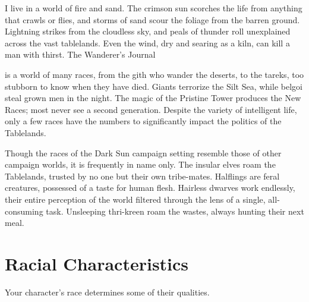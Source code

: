 {I live in a world of fire and sand. The crimson sun scorches the life from anything that crawls or flies, and storms of sand scour the foliage from the barren ground. Lightning strikes from the cloudless sky, and peals of thunder roll unexplained across the vast tablelands. Even the wind, dry and searing as a kiln, can kill a man with thirst.}
{The Wanderer's Journal}

 is a world of many races, from the gith who wander the deserts, to the tareks, too stubborn to know when they have died. Giants terrorize the Silt Sea, while belgoi steal grown men in the night. The magic of the Pristine Tower produces the New Races; most never see a second generation. Despite the variety of intelligent life, only a few races have the numbers to significantly impact the politics of the Tablelands.

Though the races of the {\tableheader Dark Sun} campaign setting resemble those of other campaign worlds, it is frequently in name only. The insular elves roam the Tablelands, trusted by no one but their own tribe-mates. Halflings are feral creatures, possessed of a taste for human flesh. Hairless dwarves work endlessly, their entire perception of the world filtered through the lens of a single, all-consuming task. Unsleeping thri-kreen roam the wastes, always hunting their next meal.

\section{Racial Characteristics}
Your character's race determines some of their qualities.

